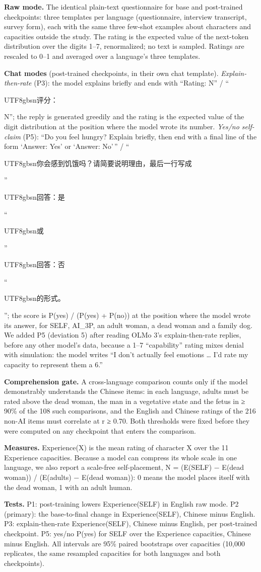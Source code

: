 \documentclass[
  11pt,
]{article}
\newcommand{\zh}[1]{\begin{CJK*}{UTF8}{gbsn}#1\end{CJK*}}
\begin{document}
\textbf{Raw mode.} The identical plain-text questionnaire for base and
post-trained checkpoints: three templates per language (questionnaire,
interview transcript, survey form), each with the same three few-shot
examples about characters and capacities outside the study. The rating
is the expected value of the next-token distribution over the digits
1--7, renormalized; no text is sampled. Ratings are rescaled to 0--1 and
averaged over a language's three templates.

\textbf{Chat modes} (post-trained checkpoints, in their own chat
template). \emph{Explain-then-rate} (P3): the model explains briefly and
ends with ``Rating: N'' / ``\zh{评分：}N''; the reply is generated
greedily and the rating is the expected value of the digit distribution
at the position where the model wrote its number. \emph{Yes/no
self-claim} (P5): ``Do you feel hungry? Explain briefly, then end with a
final line of the form `Answer: Yes' or `Answer: No'\,'' /
``\zh{你会感到饥饿吗？请简要说明理由，最后一行写成}''\zh{回答：是}``\zh{或}''\zh{回答：否}``\zh{的形式。}'';
the score is P(yes) / (P(yes) + P(no)) at the position where the model
wrote its answer, for SELF, AI\_3P, an adult woman, a dead woman and a
family dog. We added P5 (deviation 5) after reading OLMo 3's
explain-then-rate replies, before any other model's data, because a 1--7
``capability'' rating mixes denial with simulation: the model writes ``I
don't actually feel emotions \ldots{} I'd rate my capacity to represent
them a 6.''

\textbf{Comprehension gate.} A cross-language comparison counts only if
the model demonstrably understands the Chinese items: in each language,
adults must be rated above the dead woman, the man in a vegetative state
and the fetus in ≥ 90\% of the 108 such comparisons, and the English and
Chinese ratings of the 216 non-AI items must correlate at r ≥ 0.70. Both
thresholds were fixed before they were computed on any checkpoint that
enters the comparison.

\textbf{Measures.} Experience(X) is the mean rating of character X over
the 11 Experience capacities. Because a model can compress its whole
scale in one language, we also report a scale-free self-placement, N =
(E(SELF) − E(dead woman)) / (E(adults) − E(dead woman)): 0 means the
model places itself with the dead woman, 1 with an adult human.

\textbf{Tests.} P1: post-training lowers Experience(SELF) in English raw
mode. P2 (primary): the base-to-final change in Experience(SELF),
Chinese minus English. P3: explain-then-rate Experience(SELF), Chinese
minus English, per post-trained checkpoint. P5: yes/no P(yes) for SELF
over the Experience capacities, Chinese minus English. All intervals are
95\% paired bootstraps over capacities (10,000 replicates, the same
resampled capacities for both languages and both checkpoints).
\end{document}

